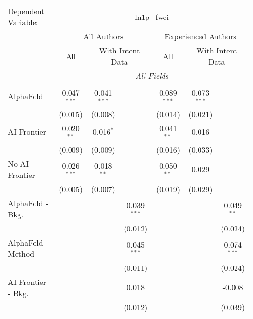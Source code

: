 \begingroup
\centering
\begin{tabular}{lcccccc}
   \tabularnewline \midrule \midrule
   Dependent Variable: & \multicolumn{6}{c}{ln1p\_fwci}\\
 & \multicolumn{3}{c}{All Authors} & \multicolumn{3}{c}{Experienced Authors} \\
\cmidrule(lr){2-4} \cmidrule(lr){5-7}
 & \multicolumn{1}{c}{All} & \multicolumn{2}{c}{With Intent Data} & \multicolumn{1}{c}{All} & \multicolumn{2}{c}{With Intent Data} \\
\cmidrule(lr){2-2} \cmidrule(lr){3-4} \cmidrule(lr){5-5} \cmidrule(lr){6-7}
 & \multicolumn{6}{c}{\textit{All Fields}} \\ \\
   AlphaFold               & 0.047$^{***}$ & 0.041$^{***}$ &               & 0.089$^{***}$ & 0.073$^{***}$ &   \\   
                           & (0.015)       & (0.008)       &               & (0.014)       & (0.021)       &   \\   
   AI Frontier             & 0.020$^{**}$  & 0.016$^{*}$   &               & 0.041$^{**}$  & 0.016         &   \\   
                           & (0.009)       & (0.009)       &               & (0.016)       & (0.033)       &   \\   
   No AI Frontier          & 0.026$^{***}$ & 0.018$^{**}$  &               & 0.050$^{**}$  & 0.029         &   \\   
                           & (0.005)       & (0.007)       &               & (0.019)       & (0.029)       &   \\   
   AlphaFold - Bkg.        &               &               & 0.039$^{***}$ &               &               & 0.049$^{**}$\\   
                           &               &               & (0.012)       &               &               & (0.024)\\   
   AlphaFold - Method      &               &               & 0.045$^{***}$ &               &               & 0.074$^{***}$\\   
                           &               &               & (0.011)       &               &               & (0.024)\\   
   AI Frontier - Bkg.      &               &               & 0.018         &               &               & -0.008\\   
                           &               &               & (0.012)       &               &               & (0.039)\\   

\end{tabular}
